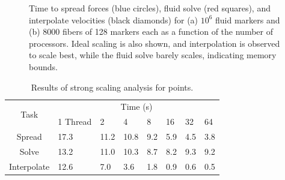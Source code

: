 \documentclass[]{article}
\begin{document}
\begin{figure}
\centering     
{}
\caption{Time to spread forces (blue circles), fluid solve (red squares), and interpolate velocities (black diamonds) for (a) $10^6$ fluid markers and (b) 8000 fibers of 128 markers each as a function of the number of processors. Ideal scaling is also shown, and interpolation is observed to scale best, while the fluid solve barely scales, indicating memory bounds. }
\label{fig:Strong}
\end{figure}

\iffalse
\begin{table}
\centering
\begin{tabular}{|c||l|l|l|l|l|l|l|}
	\hline
	\multirow{2}{*}{Task} 
	& \multicolumn{7}{c|}{Time (s)}  \\
	& 1 Thread & 2 & 4 & 8 & 16 & 32 & 64 \\  \hline
	Spread & 17.3 & 11.2 & 10.8 &9.2 &  5.9 & 4.5 & 3.8\\      \hline
	Solve & 13.2 & 11.0  & 10.3 & 8.7 & 8.2  & 9.3 & 9.2\\      \hline
	Interpolate & 12.6 & 7.0 & 3.6 & 1.8 & 0.9 & 0.6 & 0.5\\  \hline
\end{tabular}
\caption{Results of strong scaling analysis for points.}
\label{tab:ptsc}
\end{table}
\end{document}
